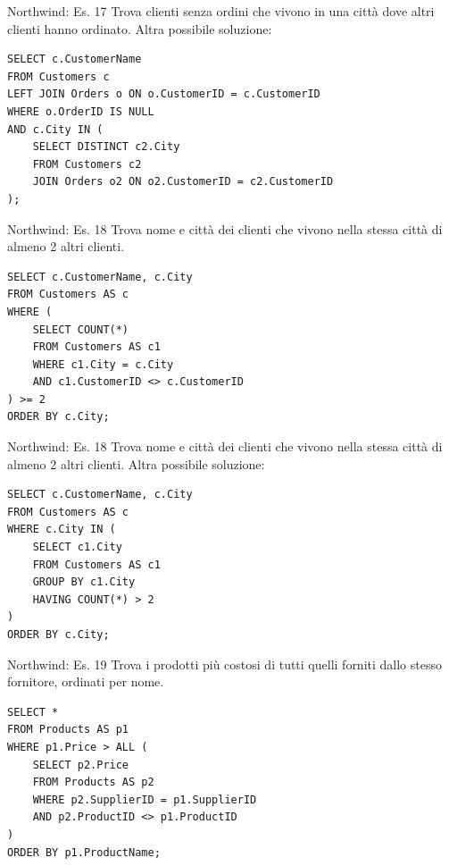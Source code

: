 \begin{frame}[fragile]{Northwind: Es. 17}
Trova clienti senza ordini che vivono in una citt\`a dove altri clienti hanno ordinato.
\newline
\newline
Altra possibile soluzione:
\begin{lstlisting}
SELECT c.CustomerName
FROM Customers c
LEFT JOIN Orders o ON o.CustomerID = c.CustomerID
WHERE o.OrderID IS NULL
AND c.City IN (
	SELECT DISTINCT c2.City
	FROM Customers c2
	JOIN Orders o2 ON o2.CustomerID = c2.CustomerID
);
\end{lstlisting}
\end{frame}
%
\begin{frame}[fragile]{Northwind: Es. 18}
Trova nome e citt\`a dei clienti che vivono nella stessa citt\`a di almeno 2 altri clienti.
\pause
\begin{lstlisting}
SELECT c.CustomerName, c.City
FROM Customers AS c
WHERE (
	SELECT COUNT(*)
    FROM Customers AS c1
    WHERE c1.City = c.City
    AND c1.CustomerID <> c.CustomerID
) >= 2
ORDER BY c.City;
\end{lstlisting}
\end{frame}

\begin{frame}[fragile]{Northwind: Es. 18}
Trova nome e citt\`a dei clienti che vivono nella stessa citt\`a di almeno 2 altri clienti.
\newline
\newline
Altra possibile soluzione:
\begin{lstlisting}
SELECT c.CustomerName, c.City
FROM Customers AS c
WHERE c.City IN (
	SELECT c1.City
    FROM Customers AS c1
    GROUP BY c1.City
    HAVING COUNT(*) > 2
)
ORDER BY c.City;
\end{lstlisting}
\end{frame}

%
\begin{frame}[fragile]{Northwind: Es. 19}
Trova i prodotti pi\`u costosi di tutti quelli forniti dallo stesso fornitore, ordinati per nome.
\pause
\begin{lstlisting}
SELECT *
FROM Products AS p1
WHERE p1.Price > ALL (
    SELECT p2.Price
    FROM Products AS p2
    WHERE p2.SupplierID = p1.SupplierID 
    AND p2.ProductID <> p1.ProductID
)
ORDER BY p1.ProductName;
\end{lstlisting}
\end{frame}

